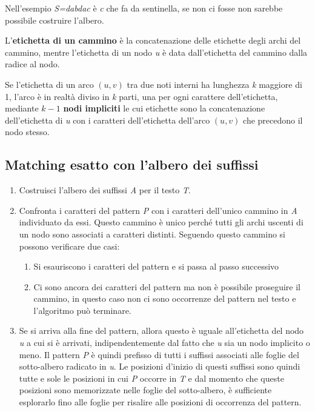 Nell'esempio \emph{S=dabdac} è \emph{c} che fa da sentinella, se non ci fosse non sarebbe possibile costruire l'albero.

L'\textbf{etichetta di un cammino} è la concatenazione delle etichette degli archi del cammino, mentre l'etichetta di un nodo \emph{u} è data dall'etichetta del cammino dalla radice al nodo.

Se l'etichetta di un arco $ (u,v) $ tra due noti interni ha lunghezza \textit{k} maggiore di 1, l'arco è in realtà diviso in \textit{k} parti, una per ogni carattere dell'etichetta, mediante $ k-1 $ \textbf{nodi impliciti} le cui etichette sono la concatenazione dell'etichetta di \textit{u} con i caratteri dell'etichetta dell'arco $ (u,v) $ che precedono il nodo stesso.

\subsection{Matching esatto con l'albero dei suffissi}\label{matching-esatto-con-lalbero-dei-suffissi}

\begin{enumerate}
	\item Costruisci l'albero dei suffissi \textit{A} per il testo \textit{T}.
	\item Confronta i caratteri del pattern \textit{P} con i caratteri dell'unico cammino in \textit{A} individuato da essi. Questo cammino è unico perché tutti gli archi uscenti di un nodo sono associati a caratteri distinti. Seguendo questo cammino si possono verificare due casi:
	\begin{enumerate}
		\item Si esauriscono i caratteri del pattern e si passa al passo successivo
		\item Ci sono ancora dei caratteri del pattern ma non è possibile proseguire il cammino, in questo caso non ci sono occorrenze del pattern nel testo e l'algoritmo può terminare.
	\end{enumerate}
	\item Se si arriva alla fine del pattern, allora questo è uguale all'etichetta del nodo \textit{u} a cui si è arrivati, indipendentemente dal fatto che \textit{u} sia un nodo implicito o meno. Il pattern \textit{P} è quindi prefisso di tutti i suffissi associati alle foglie del sotto-albero radicato in \textit{u}. Le posizioni d'inizio di questi suffissi sono quindi tutte e sole le posizioni in cui \textit{P} occorre in \textit{T} e dal momento che queste posizioni sono memorizzate nelle foglie del sotto-albero, è sufficiente esplorarlo fino alle foglie per risalire alle posizioni di occorrenza del pattern.
\end{enumerate}

